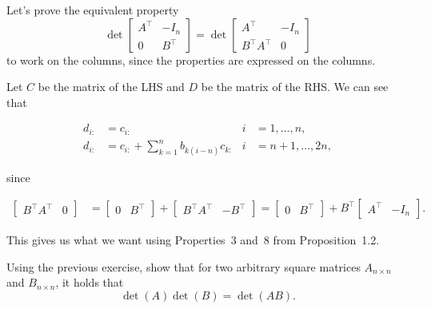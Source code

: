 \begin{solution}
  Let's prove the equivalent property
  \[
    \det\begin{bmatrix}
      A^\top & -I_n\\
      0 & B^\top
    \end{bmatrix} =
    \det\begin{bmatrix}
      A^\top & -I_n\\
      B^\top A^\top & 0
    \end{bmatrix}
  \]
  to work on the columns, since the properties are expressed
  on the columns.

  Let $C$ be the matrix of the LHS and
  $D$ be the matrix of the RHS.
  We can see that

  \begin{align*}
    d_{i:} &= c_{i:} & i & = 1, \dots, n,\\
    d_{i:} &= c_{i:} + \sum_{k=1}^n b_{k(i-n)} c_{k:} & i & = n+1, \dots, 2n,
  \end{align*}

  since

  \begin{align*}
    \begin{bmatrix}
      B^\top A^\top & 0
    \end{bmatrix}
    & =
    \begin{bmatrix}
      0 & B^\top
    \end{bmatrix}
    +
    \begin{bmatrix}
      B^\top A^\top & -B^\top
    \end{bmatrix} =
    \begin{bmatrix}
      0 & B^\top
    \end{bmatrix}
    +
    B^\top
    \begin{bmatrix}
      A^\top & -I_n
    \end{bmatrix}.
  \end{align*}

  This gives us what we want using Properties~3 and~8 from Proposition~1.2.
\end{solution}

Using the previous exercise, show that for two arbitrary square matrices \(A_{n \times n}\) and \(B_{n \times n}\), it holds that
\[
\det(A) \det(B) = \det(AB).
\]

